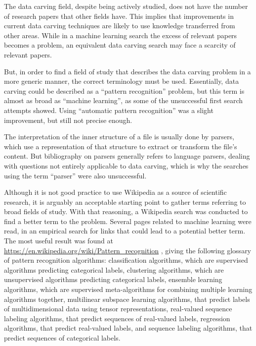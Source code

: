The data carving field, despite being actively studied, does not have the number of research papers that other fields have. This implies that improvements in current data carving techniques are likely to use knowledge transferred from other areas. While in a machine learning search the excess of relevant papers becomes a problem, an equivalent data carving search may face a scarcity of relevant papers.

But, in order to find a field of study that describes the data carving problem in a more generic manner, the correct terminology must be used. Essentially, data carving could be described as a  ``pattern recognition'' problem, but this term is almost as broad as ``machine learning'', as some of the unsuccessful first search attempts showed. Using ``automatic pattern recognition'' was a slight improvement, but still not precise enough.

The interpretation of the inner structure of a file is usually done by parsers, which use a representation of that structure to extract or transform the file's content. But bibliography on parsers generally refers to language parsers, dealing with questions not entirely applicable to data carving, which is why the searches using the term ``parser'' were also unsuccessful.

Although it is not good practice to use Wikipedia as a source of scientific research, it is arguably an acceptable starting point to gather terms referring to broad fields of study. With that reasoning, a Wikipedia search was conducted to find a better term to the problem. Several pages related to machine learning were read, in an empirical search for links that could lead to a potential better term. The most useful result was found at \url{https://en.wikipedia.org/wiki/Pattern\_recognition} \cite{wikipedia_pattern_2018}, giving the following glossary of pattern recognition algorithms:
    classification algorithms,
    which are supervised algorithms predicting categorical labels, clustering algorithms,
    which are unsupervised algorithms predicting categorical labels,
    ensemble learning algorithms,
    which are supervised meta-algorithms for combining multiple learning algorithms together,
    multilinear subspace learning algorithms,
    that predict labels of multidimensional data using tensor representations,
    real-valued sequence labeling algorithms,
    that predict sequences of real-valued labels,
    regression algorithms, 
    that predict real-valued labels,
    and sequence labeling algorithms, 
    that predict sequences of categorical labels.

